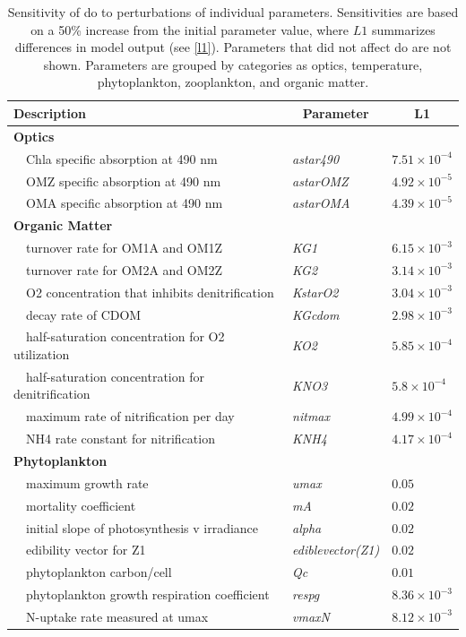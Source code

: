 \documentclass[review]{elsarticle}\usepackage[]{graphicx}\usepackage[]{color}
\begin{document}
\begin{table}[!tbp]
{\footnotesize
\caption{Sensitivity of \ac{do} to perturbations of individual parameters.  Sensitivities are based on a 50\% increase from the initial parameter value, where $L1$ summarizes differences in model output (see \cref{l1}).  Parameters that did not affect \ac{do} are not shown.  Parameters are grouped by categories as optics, temperature, phytoplankton, zooplankton, and organic matter.\label{tab:dosens}} 
\begin{center}
\begin{tabular}{lll}
\hline\hline
\multicolumn{1}{l}{Description}&\multicolumn{1}{c}{Parameter}&\multicolumn{1}{c}{L1}\tabularnewline
\hline
{\bfseries Optics}&&\tabularnewline
~~Chla specific absorption at 490 nm&\textit{astar490}&$7.51\times 10^{-4}$\tabularnewline
~~OMZ specific absorption at 490 nm&\textit{astarOMZ}&$4.92\times 10^{-5}$\tabularnewline
~~OMA specific absorption at 490 nm&\textit{astarOMA}&$4.39\times 10^{-5}$\tabularnewline
\hline
{\bfseries Organic Matter}&&\tabularnewline
~~turnover rate for OM1A and OM1Z&\textit{KG1}&$6.15\times 10^{-3}$\tabularnewline
~~turnover rate for OM2A and OM2Z&\textit{KG2}&$3.14\times 10^{-3}$\tabularnewline
~~O2 concentration that inhibits denitrification&\textit{KstarO2}&$3.04\times 10^{-3}$\tabularnewline
~~decay rate of CDOM&\textit{KGcdom}&$2.98\times 10^{-3}$\tabularnewline
~~half-saturation concentration for O2 utilization&\textit{KO2}&$5.85\times 10^{-4}$\tabularnewline
~~half-saturation concentration for denitrification&\textit{KNO3}&$5.8\times 10^{-4}$\tabularnewline
~~maximum rate of nitrification per day&\textit{nitmax}&$4.99\times 10^{-4}$\tabularnewline
~~NH4 rate constant for nitrification&\textit{KNH4}&$4.17\times 10^{-4}$\tabularnewline
\hline
{\bfseries Phytoplankton}&&\tabularnewline
~~maximum growth rate&\textit{umax}&$0.05$\tabularnewline
~~mortality coefficient&\textit{mA}&$0.02$\tabularnewline
~~initial slope of photosynthesis v irradiance&\textit{alpha}&$0.02$\tabularnewline
~~edibility vector for Z1&\textit{ediblevector(Z1)}&$0.02$\tabularnewline
~~phytoplankton carbon/cell&\textit{Qc}&$0.01$\tabularnewline
~~phytoplankton growth respiration coefficient&\textit{respg}&$8.36\times 10^{-3}$\tabularnewline
~~N-uptake rate measured at umax&\textit{vmaxN}&$8.12\times 10^{-3}$\tabularnewline

\end{tabular}
\end{center}}
\end{table}
\end{document}
